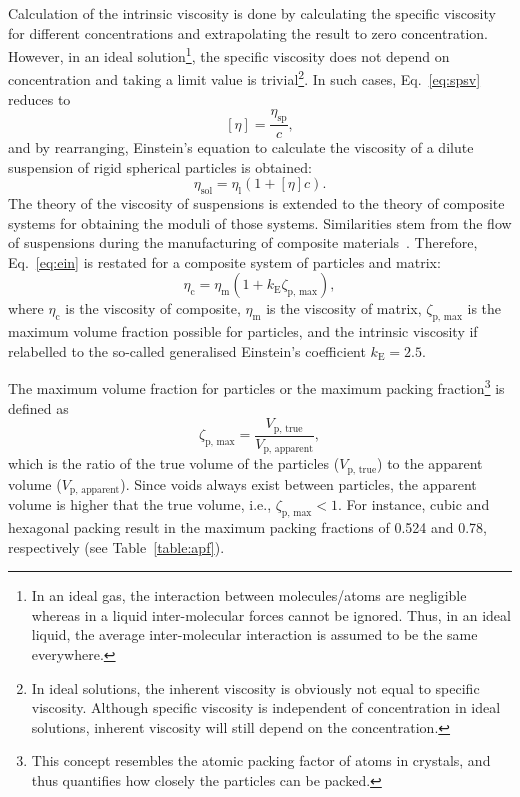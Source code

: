 	Calculation of the intrinsic viscosity is done by calculating the specific viscosity for different concentrations and extrapolating the result to zero concentration. However, in an ideal solution\footnote{In an ideal gas, the interaction between molecules/atoms are negligible whereas in a liquid inter-molecular forces cannot be ignored. Thus, in an ideal liquid, the average inter-molecular interaction is assumed to be the same everywhere.}, the specific viscosity does not depend on concentration and taking a limit value is trivial\footnote{In ideal solutions, the inherent viscosity is obviously not equal to specific viscosity. Although specific viscosity is independent of concentration in ideal solutions, inherent viscosity will still depend on the concentration.}. In such cases, Eq.~\eqref{eq:spsv} reduces to
	\begin{equation}
		\left[\eta\right] = \frac{\eta_\text{sp}}{c},
	\end{equation}	
	and by rearranging, Einstein's equation to calculate the viscosity of a dilute suspension of rigid spherical particles is obtained:
	\begin{equation}
		\eta_\text{sol} = \eta_{\text{l}}(1+\left[\eta\right]c).\label{eq:ein}
	\end{equation}
	The theory of the viscosity of suspensions is extended to the theory of composite systems for obtaining the moduli of those systems. Similarities stem from the flow of suspensions during the manufacturing of composite materials~\autocite{Nielsen.1994}. Therefore, Eq.~\eqref{eq:ein} is restated for a composite system of particles and matrix:
	\begin{equation}
		\eta_\text{c} = \eta_{\text{m}}(1+k_\text{E}\zeta_\text{p, max}),
	\end{equation}	
	where $\eta_\text{c}$ is the viscosity of composite, $\eta_\text{m}$ is the viscosity of matrix, $\zeta_\text{p, max}$ is the maximum volume fraction possible for particles, and the intrinsic viscosity if relabelled to the so-called generalised Einstein's coefficient $k_\text{E}=2.5$.
	
	The maximum volume fraction for particles or the maximum packing fraction\footnote{This concept resembles the atomic packing factor of atoms in crystals, and thus quantifies how closely the particles can be packed.} is defined as
	\begin{equation}
		\zeta_\text{p, max}=\frac{V_\text{p, true}}{V_\text{p, apparent}},
	\end{equation}
	which is the ratio of the true volume of the particles ($V_\text{p, true}$) to the apparent volume ($V_\text{p, apparent}$). Since voids always exist between particles, the apparent volume is higher that the true volume, i.e., $\zeta_\text{p, max}<1$. For instance, cubic and hexagonal packing result in the maximum packing fractions of 0.524 and 0.78, respectively (see Table~\ref{table:apf}).

